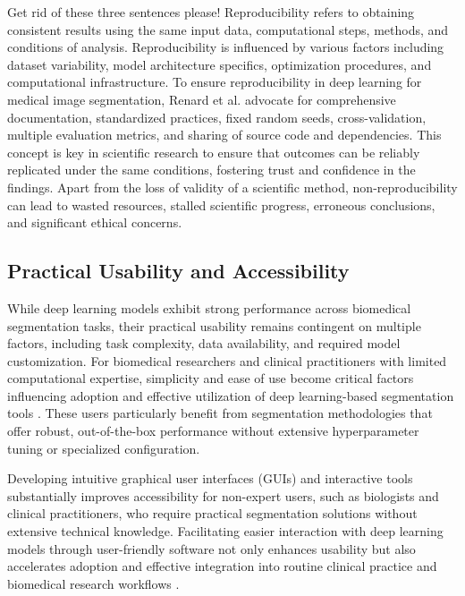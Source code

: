 \documentclass[./dissertation.tex]{subfiles}
\begin{document}
\textcolor{Hedges}{Get rid of these three sentences please!} Reproducibility refers to obtaining consistent results using the same input data, computational steps, methods, and conditions of analysis. Reproducibility is influenced by various factors including dataset variability, model architecture specifics, optimization procedures, and computational infrastructure. To ensure reproducibility in deep learning for medical image segmentation, Renard et al. advocate for comprehensive documentation, standardized practices, fixed random seeds, cross-validation, multiple evaluation metrics, and sharing of source code and dependencies. This concept is key in scientific research to ensure that outcomes can be reliably replicated under the same conditions, fostering trust and confidence in the findings. Apart from the loss of validity of a scientific method, non-reproducibility can lead to wasted resources, stalled scientific progress, erroneous conclusions, and significant ethical concerns.


\textcolor{BulldogRed}{\subsection{Practical Usability and Accessibility}}
\textcolor{BulldogRed}{While deep learning models exhibit strong performance across biomedical segmentation tasks, their practical usability remains contingent on multiple factors, including task complexity, data availability, and required model customization. For biomedical researchers and clinical practitioners with limited computational expertise, simplicity and ease of use become critical factors influencing adoption and effective utilization of deep learning-based segmentation tools \cite{wang2021annotation}. These users particularly benefit from segmentation methodologies that offer robust, out-of-the-box performance without extensive hyperparameter tuning or specialized configuration.}

\textcolor{BulldogRed}{Developing intuitive graphical user interfaces (GUIs) and interactive tools substantially improves accessibility for non-expert users, such as biologists and clinical practitioners, who require practical segmentation solutions without extensive technical knowledge. Facilitating easier interaction with deep learning models through user-friendly software not only enhances usability but also accelerates adoption and effective integration into routine clinical practice and biomedical research workflows \cite{sofroniew2022napari}.}
\end{document}
